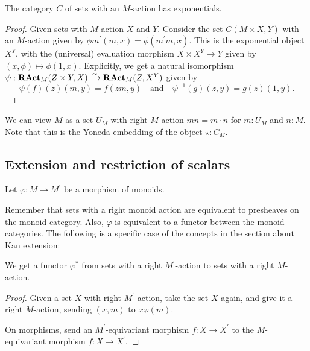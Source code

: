 \begin{lemma}
  The category $ C $ of sets with an $ M $-action has exponentials.
\end{lemma}
\begin{proof}
  Given sets with $ M $-action $ X $ and $ Y $. Consider the set $ C(M \times X, Y) $ with an $ M $-action given by $ \phi m^\prime(m, x) = \phi(m^\prime m, x) $. This is the exponential object $ X^Y $, with the (universal) evaluation morphism $ X \times X^Y \to Y $ given by $ (x, \phi) \mapsto \phi(1, x) $. Explicitly, we get a natural isomorphism $ \psi: \mathbf{RAct}_{M}(Z \times Y, X) \xrightarrow \sim \mathbf{RAct}_{M}(Z, X^Y) $ given by
  \[ \psi(f)(z)(m, y) = f(z m, y) \quad \text{and} \quad \psi^{-1}(g)(z, y) = g(z)(1, y). \]
\end{proof}

\begin{definition}
  We can view $ M $ as a set $ U_M $ with right $ M $-action $ m n = m \cdot n $ for $ m: U_M $ and $ n: M $. Note that this is the Yoneda embedding of the object $ \star : C_M $.
\end{definition}

\subsection{Extension and restriction of scalars}

Let $ \varphi: M \to M^\prime $ be a morphism of monoids.

Remember that sets with a right monoid action are equivalent to presheaves on the monoid category. Also, $ \varphi $ is equivalent to a functor between the monoid categories. The following is a specific case of the concepts in the section about Kan extension:

\begin{lemma}
  We get a  functor $ \varphi^* $ from sets with a right $ M^\prime $-action to sets with a right $ M $-action.
\end{lemma}
\begin{proof}
  Given a set $ X $ with right $ M^\prime $-action, take the set $ X $ again, and give it a right $ M $-action, sending $ (x, m) $ to $ x \varphi(m) $.

  On morphisms, send an $ M^\prime $-equivariant morphism $ f: X \to X^\prime $ to the $ M $-equivariant morphism $ f: X \to X^\prime $.
\end{proof}

